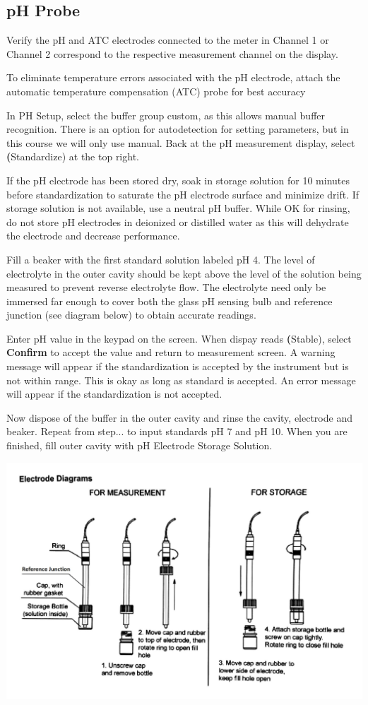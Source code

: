 \documentclass[12pt]{../SOP3}\usepackage[]{graphicx}\usepackage[]{color}
\begin{document}
\subsection{pH Probe}

\NP Verify the pH and ATC electrodes connected to the meter in Channel 1 or Channel 2 correspond to the respective measurement channel on the display.

To eliminate temperature errors associated with the pH electrode, attach the automatic temperature
compensation (ATC) probe for best accuracy

\NP In PH Setup, select the buffer group custom, as this allows manual buffer recognition. There is an option for autodetection for setting parameters, but in this course we will only use manual.
\NP Back at the pH measurement display, select \textbf(Standardize) at the top right.

\NP If the pH electrode has been stored dry, soak in storage solution for 10 minutes before standardization to saturate the pH electrode surface and minimize drift. If storage solution is not available, use a neutral pH buffer. While OK for rinsing, do not store pH electrodes in deionized or distilled water as this will dehydrate the electrode and decrease performance.

\NP Fill a beaker with the first standard solution labeled pH 4. The level of electrolyte in the outer cavity should be kept above the level of the solution being measured to prevent reverse electrolyte flow. The electrolyte need only be immersed far enough to cover both the glass pH sensing bulb and reference junction (see diagram below) to obtain accurate readings.

\NP Enter pH value in the keypad on the screen.
\NP When dispay reads \textbf(Stable), select \textbf{Confirm} to accept the value and return to measurement screen. A warning message will appear if the standardization is accepted by the instrument but is not within range. This is okay as long as standard is accepted. An error message will appear if the standardization is not accepted.

\NP Now dispose of the buffer in the outer cavity and rinse the cavity, electrode and beaker. Repeat from step... to input standards pH 7 and pH 10.
\NP When you are finished, fill outer cavity with pH Electrode Storage Solution.

\NP\includegraphics[scale=.25]{Electrode.jpg}
\end{document}
